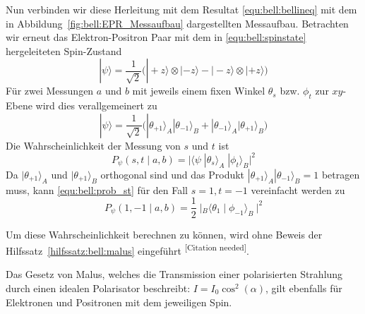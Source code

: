 \begin{refsection}
Nun verbinden wir diese Herleitung mit dem Resultat \eqref{equ:bell:bellineq}
mit dem in Abbildung~\ref{fig:bell:EPR_Messaufbau} dargestellten Messaufbau.
Betrachten wir erneut das Elektron-Positron Paar mit dem in
\eqref{equ:bell:spinstate} hergeleiteten Spin-Zustand
\begin{equation*}
    |\psi\rangle = \frac{1}{\sqrt{2}} \Big( 
        |{+}z\rangle \otimes |{-}z\rangle - |{-}z\rangle \otimes |{+}z\rangle
     \Big)
\end{equation*}
F\"ur zwei Messungen $a$ und $b$ mit jeweils einem fixen Winkel $\theta_s$ bzw.
$\phi_t$ zur $xy$-Ebene wird dies verallgemeinert zu
\begin{equation}
    |\psi\rangle = \frac{1}{\sqrt{2}} \Big(
        |\theta_{+1}\rangle_A |\theta_{-1}\rangle_B + |\theta_{-1}\rangle_A |\theta_{+1}\rangle_B
    \Big)
\end{equation}
Die Wahrscheinlichkeit der Messung von $s$ und $t$ ist
\begin{equation}
    P_{\psi}(s,t \mid a,b) = 
    \Big| \langle \psi \; |\theta_s \rangle_A \; |\phi_t\rangle_B\Big|^2
    \label{equ:bell:prob_st}
\end{equation}
Da $|\theta_{+1}\rangle_A$ und $|\theta_{+1}\rangle_B$ orthogonal sind und
das Produkt $|\theta_{+1}\rangle_A|\theta_{-1}\rangle_B = 1$ betragen muss,
kann \eqref{equ:bell:prob_st} f\"ur den Fall $s=1,t=-1$ vereinfacht werden zu
\[
    P_{\psi}(1,-1 \mid a,b) = 
    \frac{1}{2} \; \Big| {}_B\langle \theta_1 \mid \phi_{-1} \rangle_B  \ \Big|^2
\]

Um diese Wahrscheinlichkeit berechnen zu k\"onnen, wird ohne Beweis der
Hilfssatz~\ref{hilfssatz:bell:malus} eingef\"uhrt
\textsuperscript{[Citation needed]}.

\begin{hilfssatz}\label{hilfssatz:bell:malus}
    Das Gesetz von Malus, welches die Transmission einer polarisierten
    Strahlung durch einen idealen Polarisator beschreibt: 
    $I = I_0 \cos^2(\alpha)$, gilt ebenfalls f\"ur Elektronen und Positronen
    mit dem jeweiligen Spin.
\end{hilfssatz}


\end{refsection}
